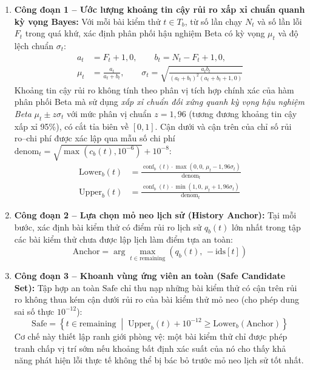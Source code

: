 \begin{enumerate}
    \item \textbf{Công đoạn 1 -- Ước lượng khoảng tin cậy rủi ro xấp xỉ chuẩn quanh kỳ vọng Bayes:}
    Với mỗi bài kiểm thử $t \in T_b$, từ số lần chạy $N_t$ và số lần lỗi $F_t$ trong quá khứ, xác định phân phối hậu nghiệm Beta có kỳ vọng $\mu_t$ và độ lệch chuẩn $\sigma_t$:
    \begin{align}
    a_t &= F_t + 1{,}0, \qquad b_t = N_t - F_t + 1{,}0, \\
    \mu_t &= \frac{a_t}{a_t + b_t}, \qquad \sigma_t = \sqrt{\frac{a_t b_t}{(a_t + b_t)^2 (a_t + b_t + 1{,}0)}}
    \end{align}
    Khoảng tin cậy rủi ro không tính theo phân vị tích hợp chính xác của hàm phân phối Beta mà sử dụng \textit{xấp xỉ chuẩn đối xứng quanh kỳ vọng hậu nghiệm Beta} $\mu_t \pm z \sigma_t$ với mức phân vị chuẩn $z = 1{,}96$ (tương đương khoảng tin cậy xấp xỉ 95\%), có cắt tỉa biên về $[0, 1]$. Cận dưới và cận trên của chỉ số rủi ro--chi phí được xác lập qua mẫu số chi phí $\text{denom}_t = \sqrt{\max(c_b(t), 10^{-6})} + 10^{-8}$:
    \begin{align}
    \text{Lower}_b(t) &= \frac{\operatorname{conf}_b(t) \cdot \max(0{,}0, \, \mu_t - 1{,}96 \sigma_t)}{\text{denom}_t} \\
    \text{Upper}_b(t) &= \frac{\operatorname{conf}_b(t) \cdot \min(1{,}0, \, \mu_t + 1{,}96 \sigma_t)}{\text{denom}_t}
    \end{align}

    \item \textbf{Công đoạn 2 -- Lựa chọn mỏ neo lịch sử (History Anchor):}
    Tại mỗi bước, xác định bài kiểm thử có điểm rủi ro lịch sử $q_b(t)$ lớn nhất trong tập các bài kiểm thử chưa được lập lịch làm điểm tựa an toàn:
    \begin{equation}
    \text{Anchor} = \arg\max_{t \in \text{remaining}} \left( q_b(t), \, -\text{ids}[t] \right)
    \end{equation}

    \item \textbf{Công đoạn 3 -- Khoanh vùng ứng viên an toàn (Safe Candidate Set):}
    Tập hợp an toàn $\text{Safe}$ chỉ thu nạp những bài kiểm thử có cận trên rủi ro không thua kém cận dưới rủi ro của bài kiểm thử mỏ neo (cho phép dung sai số thực $10^{-12}$):
    \begin{equation}
    \text{Safe} = \left\{ t \in \text{remaining} \;\middle|\; \text{Upper}_b(t) + 10^{-12} \ge \text{Lower}_b(\text{Anchor}) \right\}
    \end{equation}
    Cơ chế này thiết lập ranh giới phòng vệ: một bài kiểm thử chỉ được phép tranh chấp vị trí sớm nếu khoảng bất định xác suất của nó cho thấy khả năng phát hiện lỗi thực tế không thể bị bác bỏ trước mỏ neo lịch sử tốt nhất.


\end{enumerate}
